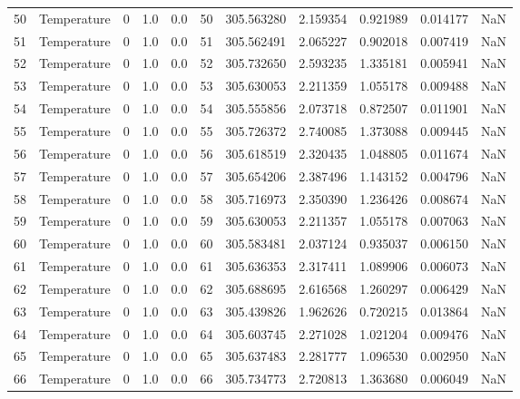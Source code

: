 \begin{tabular}{llrrrrrrrrr}
50  &  Temperature &       0 &  1.0 &  0.0 &   50 &  305.563280 &  2.159354 &  0.921989 &   0.014177 &      NaN \\
51  &  Temperature &       0 &  1.0 &  0.0 &   51 &  305.562491 &  2.065227 &  0.902018 &   0.007419 &      NaN \\
52  &  Temperature &       0 &  1.0 &  0.0 &   52 &  305.732650 &  2.593235 &  1.335181 &   0.005941 &      NaN \\
53  &  Temperature &       0 &  1.0 &  0.0 &   53 &  305.630053 &  2.211359 &  1.055178 &   0.009488 &      NaN \\
54  &  Temperature &       0 &  1.0 &  0.0 &   54 &  305.555856 &  2.073718 &  0.872507 &   0.011901 &      NaN \\
55  &  Temperature &       0 &  1.0 &  0.0 &   55 &  305.726372 &  2.740085 &  1.373088 &   0.009445 &      NaN \\
56  &  Temperature &       0 &  1.0 &  0.0 &   56 &  305.618519 &  2.320435 &  1.048805 &   0.011674 &      NaN \\
57  &  Temperature &       0 &  1.0 &  0.0 &   57 &  305.654206 &  2.387496 &  1.143152 &   0.004796 &      NaN \\
58  &  Temperature &       0 &  1.0 &  0.0 &   58 &  305.716973 &  2.350390 &  1.236426 &   0.008674 &      NaN \\
59  &  Temperature &       0 &  1.0 &  0.0 &   59 &  305.630053 &  2.211357 &  1.055178 &   0.007063 &      NaN \\
60  &  Temperature &       0 &  1.0 &  0.0 &   60 &  305.583481 &  2.037124 &  0.935037 &   0.006150 &      NaN \\
61  &  Temperature &       0 &  1.0 &  0.0 &   61 &  305.636353 &  2.317411 &  1.089906 &   0.006073 &      NaN \\
62  &  Temperature &       0 &  1.0 &  0.0 &   62 &  305.688695 &  2.616568 &  1.260297 &   0.006429 &      NaN \\
63  &  Temperature &       0 &  1.0 &  0.0 &   63 &  305.439826 &  1.962626 &  0.720215 &   0.013864 &      NaN \\
64  &  Temperature &       0 &  1.0 &  0.0 &   64 &  305.603745 &  2.271028 &  1.021204 &   0.009476 &      NaN \\
65  &  Temperature &       0 &  1.0 &  0.0 &   65 &  305.637483 &  2.281777 &  1.096530 &   0.002950 &      NaN \\
66  &  Temperature &       0 &  1.0 &  0.0 &   66 &  305.734773 &  2.720813 &  1.363680 &   0.006049 &      NaN \\

\end{tabular}
